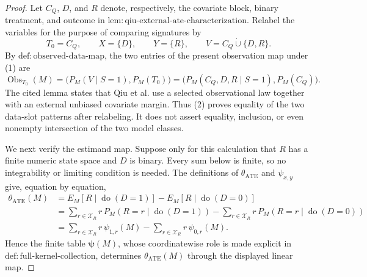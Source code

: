 \documentclass{article}
\begin{document}
\begin{proof}
Let \(C_Q\), \(D\), and \(R\) denote, respectively, the covariate block, binary treatment, and outcome in \(\mathrm{lem:qiu\text{-}external\text{-}ate\text{-}characterization}\).  Relabel the variables for the purpose of comparing signatures by
\[
T_0=C_Q,\qquad X=\{D\},\qquad Y=\{R\},\qquad
V=C_Q\mathbin{\dot\cup}\{D,R\}.
\tag{1}
\]
By \(\mathrm{def:observed\text{-}data\text{-}map}\), the two entries of the present observation map under (1) are
\[
\operatorname{Obs}_{T_0}(M)
=\bigl(P_M(V\mid S=1),P_M(T_0)\bigr)
=\bigl(P_M(C_Q,D,R\mid S=1),P_M(C_Q)\bigr).
\tag{2}
\]
The cited lemma states that Qiu et al. use a selected observational law together with an external unbiased covariate margin.  Thus (2) proves equality of the two data-slot patterns after relabeling.  It does not assert equality, inclusion, or even nonempty intersection of the two model classes.

We next verify the estimand map.  Suppose only for this calculation that \(R\) has a finite numeric state space and \(D\) is binary.  Every sum below is finite, so no integrability or limiting condition is needed.  The definitions of \(\theta_{\mathrm{ATE}}\) and \(\psi_{x,y}\) give, equation by equation,
\[
\begin{aligned}
\theta_{\mathrm{ATE}}(M)
&=E_M[R\mid\operatorname{do}(D=1)]
  -E_M[R\mid\operatorname{do}(D=0)]\\
&=\sum_{r\in\mathcal X_R}r\,
  P_M(R=r\mid\operatorname{do}(D=1))
  -\sum_{r\in\mathcal X_R}r\,
  P_M(R=r\mid\operatorname{do}(D=0))\\
&=\sum_{r\in\mathcal X_R}r\,\psi_{1,r}(M)
  -\sum_{r\in\mathcal X_R}r\,\psi_{0,r}(M).
\end{aligned}
\tag{3}
\]
Hence the finite table \(\boldsymbol\psi(M)\), whose coordinatewise role is made explicit in \(\mathrm{def:full\text{-}kernel\text{-}collection}\), determines \(\theta_{\mathrm{ATE}}(M)\) through the displayed linear map.


\end{proof}
\end{document}
